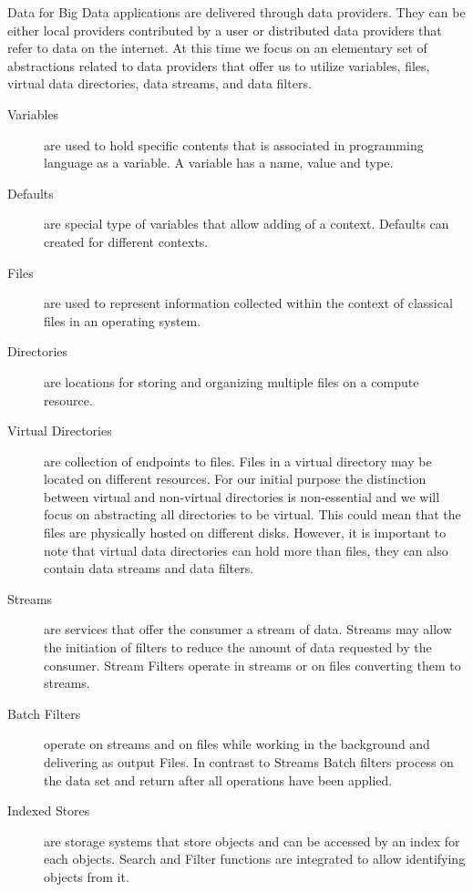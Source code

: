 \documentclass[10pt]{article}
\begin{document}
Data for Big Data applications are delivered through data
providers. They can be either local providers contributed by a user or
distributed data providers that refer to data on the internet. At this
time we focus on an elementary set of abstractions related to data
providers that offer us to utilize variables, files, virtual data
directories, data streams, and data filters.

\begin{description}
\item[Variables] are used to hold specific contents that is associated
  in programming language as a variable. A variable has a name, value
  and type.

\item[Defaults] are special type of variables that allow adding of a
  context. Defaults can created for different contexts.

\item[Files] are used to represent information collected within the
  context of classical files in an operating system.

\item[Directories] are locations for storing and organizing multiple
  files on a compute resource.

\item[Virtual Directories] are collection
  of endpoints to files. Files in a virtual directory may be located
  on different resources. For our initial purpose the distinction
  between virtual and non-virtual directories is non-essential and we
  will focus on abstracting all directories to be virtual. This could
  mean that the files are physically hosted on different
  disks. However, it is important to note that virtual data
  directories can hold more than files, they can also contain data
  streams and data filters. 

\item[Streams] are services that offer the consumer a stream of
  data. Streams may allow the initiation of filters to reduce the
  amount of data requested by the consumer.  Stream Filters operate in
  streams or on files converting them to streams.

\item[Batch Filters] operate on streams and on files while working in
  the background and delivering as output Files. In contrast to
  Streams Batch filters process on the data set and return after all
  operations have been applied.

\item[Indexed Stores] are storage systems that store objects and can be
  accessed by an index for each objects. Search and Filter functions
  are integrated to allow identifying objects from it.


\end{description}
\end{document}
